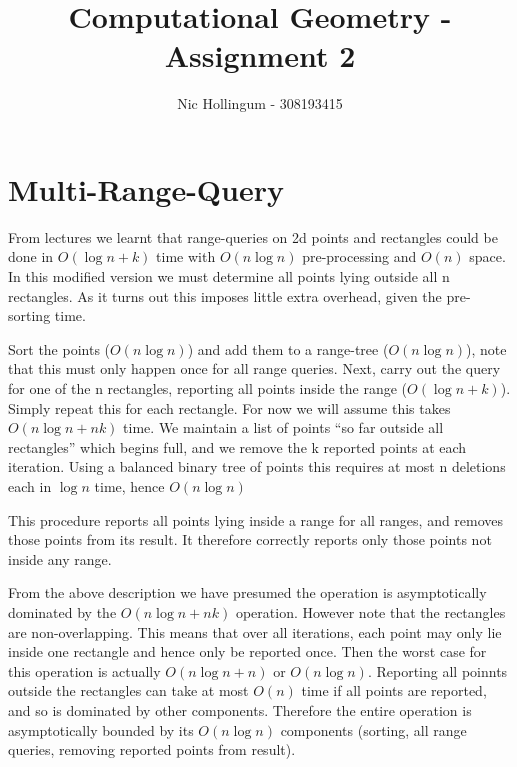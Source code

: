 
\author{Nic Hollingum - 308193415}
\title{Computational Geometry - Assignment 2}

\addtolength{\oddsidemargin}{-.875in}
\addtolength{\evensidemargin}{-.875in}
\addtolength{\textwidth}{1.75in}
\addtolength{\topmargin}{-.875in}
\addtolength{\textheight}{1.75in}


\maketitle

\section {Multi-Range-Query}
From lectures we learnt that range-queries on 2d points and rectangles could be done in $O(\log n + k)$ time with $O(n \log n)$ pre-processing and $O(n)$ space.
In this modified version we must determine all points lying outside all n rectangles.
As it turns out this imposes little extra overhead, given the pre-sorting time.

Sort the points ($O(n \log n)$) and add them to a range-tree ($O(n \log n)$), note that this must only happen once for all range queries.
Next, carry out the query for one of the n rectangles, reporting all points inside the range ($O(\log n + k)$).
Simply repeat this for each rectangle.
For now we will assume this takes $O(n \log n + nk)$ time.
We maintain a list of points ``so far outside all rectangles'' which begins full, and we remove the k reported points at each iteration.
Using a balanced binary tree of points this requires at most n deletions each in $\log n$ time, hence $O(n \log n)$

This procedure reports all points lying inside a range for all ranges, and removes those points from its result.
It therefore correctly reports only those points not inside any range.

From the above description we have presumed the operation is asymptotically dominated by the $O(n \log n + nk)$ operation.
However note that the rectangles are non-overlapping.
This means that over all iterations, each point may only lie inside one rectangle and hence only be reported once.
Then the worst case for this operation is actually $O(n \log n + n)$ or $O(n \log n)$.
Reporting all poinnts outside the rectangles can take at most $O(n)$ time if all points are reported, and so is dominated by other components.
Therefore the entire operation is asymptotically bounded by its $O(n \log n)$ components (sorting, all range queries, removing reported points from result).

